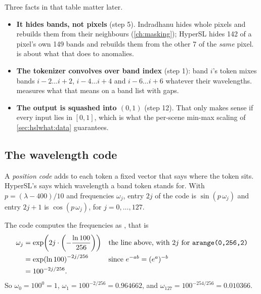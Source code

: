 Three facts in that table matter later.
\begin{itemize}
\item \textbf{It hides bands, not pixels} (step 5). Indradhanu hides whole pixels and rebuilds them from their
neighbours (\cref{ch:masking}); HyperSL hides 142 of a pixel's own 149 bands and rebuilds them from the other 7 of
the \emph{same} pixel.  is about what that does to anomalies.
\item \textbf{The tokenizer convolves over band index} (step 1): band $i$'s token mixes bands $i-2\dots i+2$, $i-4\dots
i+4$ and $i-6\dots i+6$ whatever their wavelengths.  measures what that means on a band list
with gaps.
\item \textbf{The output is squashed into $(0,1)$} (step 12). That only makes sense if every input lies in $[0,1]$,
which is what the per-scene min-max scaling of \cref{sec:hslwhat:data} guarantees.
\end{itemize}

\subsection{The wavelength code}

\begin{definition}
A \emph{position code} adds to each token a fixed vector that says where the token sits. HyperSL's
says which wavelength a band token stands for. With $p=(\lambda-400)/10$ and frequencies $\omega_j$, entry $2j$ of
the code is $\sin(p\,\omega_j)$ and entry $2j+1$ is $\cos(p\,\omega_j)$, for $j=0,\dots,127$.
\end{definition}

The code computes the frequencies as
, that is
\begin{align}
\omega_j &= \exp\!\left(2j\cdot\left(-\frac{\ln 100}{256}\right)\right) && \text{the line above, with }2j\text{ for }\texttt{arange(0,256,2)}\notag\\
&= \exp\!\left(\ln 100\right)^{-2j/256} && \text{since }e^{-ab}=(e^{a})^{-b}\notag\\
&= 100^{-2j/256}. \label{eq:hslwhat:omega}
\end{align}
So $\omega_0=100^0=1$, $\omega_1=100^{-2/256}=0.964662$, and $\omega_{127}=100^{-254/256}=0.010366$\tagC.

